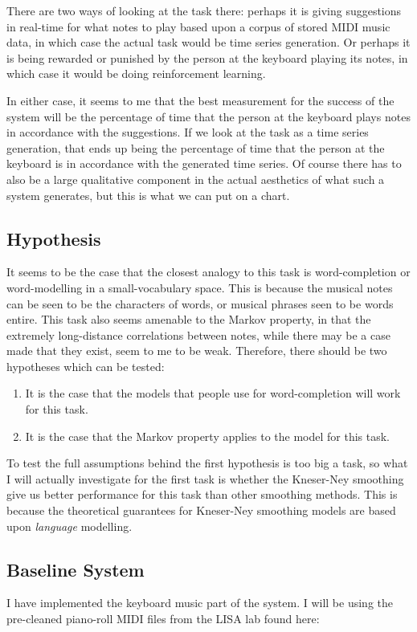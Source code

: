 \documentclass{article}
\begin{document}
There are two ways of looking at the task there: perhaps it is giving suggestions in real-time for what notes to play based upon a corpus of stored MIDI music data, in which case the actual task would be time series generation. Or perhaps it is being rewarded or punished by the person at the keyboard playing its notes, in which case it would be doing reinforcement learning.

In either case, it seems to me that the best measurement for the success of the system will be the percentage of time that the person at the keyboard plays notes in accordance with the suggestions. If we look at the task as a time series generation, that ends up being the percentage of time that the person at the keyboard is in accordance with the generated time series. Of course there has to also be a large qualitative component in the actual aesthetics of what such a system generates, but this is what we can put on a chart. 

\subsection*{Hypothesis}
It seems to be the case that the closest analogy to this task is word-completion or word-modelling in a small-vocabulary space. This is because the musical notes can be seen to be the characters of words, or musical phrases seen to be words entire. This task also seems amenable to the Markov property, in that the extremely long-distance correlations between notes, while there may be a case made that they exist, seem to me to be weak. Therefore, there should be two hypotheses which can
be tested:

\begin{enumerate}
    \item It is the case that the models that people use for word-completion will work for this task.
    \item It is the case that the Markov property applies to the model for this task.
\end{enumerate}

To test the full assumptions behind the first hypothesis is too big a task, so what I will actually investigate for the first task is whether the Kneser-Ney smoothing give us better performance for this task than other smoothing methods. This is because the theoretical guarantees for Kneser-Ney smoothing models are based upon \emph{language} modelling.

\subsection*{Baseline System}
I have implemented the keyboard music part of the system. I will be using the pre-cleaned piano-roll MIDI files from the LISA lab found here:
\end{document}
